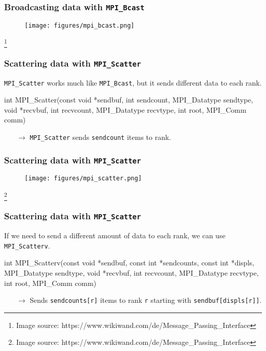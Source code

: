 \documentclass[12pt,t]{beamer}
\newcommand\blfootnote[1]{%
  \begingroup
  \renewcommand\thefootnote{}\footnote{\tiny #1}%
  \addtocounter{footnote}{-1}%
  \endgroup
}
\let\emph\relax %
\newcommand{\conclude}[1]{%
  \begin{itemize}
    \item[$\rightarrow$]#1
  \end{itemize}
}
\begin{document}
  \begin{frame}[fragile]
    \frametitle{Broadcasting data with \texttt{MPI\_Bcast}}

    \begin{figure}
      \centering
      \texttt{[image: figures/mpi\_bcast.png]}
    \end{figure}
    \blfootnote{Image source: https://www.wikiwand.com/de/Message\_Passing\_Interface}
  \end{frame}

  \begin{frame}[fragile]
    \frametitle{Scattering data with \texttt{MPI\_Scatter}}

    \texttt{MPI\_Scatter} works much like \texttt{MPI\_Bcast}, but it sends different data to each rank.
    \begin{code}
int MPI_Scatter(const void *sendbuf,
                int sendcount,
                MPI_Datatype sendtype,
                void *recvbuf,
                int recvcount,
                MPI_Datatype recvtype,
                int root,
                MPI_Comm comm)
    \end{code}
    \conclude{\texttt{MPI\_Scatter} sends \texttt{sendcount} items to \emph{each} rank.}
  \end{frame}

  \begin{frame}[fragile]
    \frametitle{Scattering data with \texttt{MPI\_Scatter}}

    \begin{figure}
      \centering
      \texttt{[image: figures/mpi\_scatter.png]}
    \end{figure}
    \blfootnote{Image source: https://www.wikiwand.com/de/Message\_Passing\_Interface}
  \end{frame}

  \begin{frame}[fragile]
    \frametitle{Scattering data with \texttt{MPI\_Scatter}}

    If we need to send a different amount of data to each rank, we can use \texttt{MPI\_Scatterv}.
    \begin{code}
int MPI_Scatterv(const void *sendbuf,
                 const int *sendcounts,
                 const int *displs,
                 MPI_Datatype sendtype,
                 void *recvbuf,
                 int recvcount,
                 MPI_Datatype recvtype,
                 int root,
                 MPI_Comm comm)
    \end{code}
    \conclude{Sends \texttt{sendcounts[r]} items to rank \texttt{r} starting with \texttt{sendbuf[displs[r]]}.}
  \end{frame}
\end{document}
